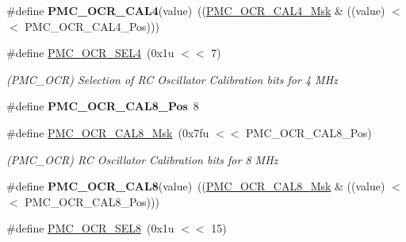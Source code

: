 \begin{DoxyCompactItemize}
\mbox{\label{group__SAME70__PMC_gade8c1c8e3ba9b7608a2f284d754883b2}} 
\#define {\bfseries P\+M\+C\+\_\+\+O\+C\+R\+\_\+\+C\+A\+L4}(value)~((\mbox{\hyperlink{group__SAMV71__PMC_ga235fcd9ef2280ab09e882e6feab2fcb4}{P\+M\+C\+\_\+\+O\+C\+R\+\_\+\+C\+A\+L4\+\_\+\+Msk}} \& ((value) $<$$<$ P\+M\+C\+\_\+\+O\+C\+R\+\_\+\+C\+A\+L4\+\_\+\+Pos)))
\item 
\mbox{\label{group__SAME70__PMC_ga66f57c76dd065ade034713e42feb7f66}} 
\#define \mbox{\hyperlink{group__SAME70__PMC_ga66f57c76dd065ade034713e42feb7f66}{P\+M\+C\+\_\+\+O\+C\+R\+\_\+\+S\+E\+L4}}~(0x1u $<$$<$ 7)
\begin{DoxyCompactList}\small\item\em (P\+M\+C\+\_\+\+O\+CR) Selection of RC Oscillator Calibration bits for 4 M\+Hz \end{DoxyCompactList}\item 
\mbox{\label{group__SAME70__PMC_gaeae5979b2df8f5a8d390e59e0e88dc6b}} 
\#define {\bfseries P\+M\+C\+\_\+\+O\+C\+R\+\_\+\+C\+A\+L8\+\_\+\+Pos}~8
\item 
\mbox{\label{group__SAME70__PMC_gaa11a6b2f86faf3641f789b99e88f3413}} 
\#define \mbox{\hyperlink{group__SAME70__PMC_gaa11a6b2f86faf3641f789b99e88f3413}{P\+M\+C\+\_\+\+O\+C\+R\+\_\+\+C\+A\+L8\+\_\+\+Msk}}~(0x7fu $<$$<$ P\+M\+C\+\_\+\+O\+C\+R\+\_\+\+C\+A\+L8\+\_\+\+Pos)
\begin{DoxyCompactList}\small\item\em (P\+M\+C\+\_\+\+O\+CR) RC Oscillator Calibration bits for 8 M\+Hz \end{DoxyCompactList}\item 
\mbox{\label{group__SAME70__PMC_ga914c02dfef2c0a80f6ab649772016836}} 
\#define {\bfseries P\+M\+C\+\_\+\+O\+C\+R\+\_\+\+C\+A\+L8}(value)~((\mbox{\hyperlink{group__SAMV71__PMC_gaa11a6b2f86faf3641f789b99e88f3413}{P\+M\+C\+\_\+\+O\+C\+R\+\_\+\+C\+A\+L8\+\_\+\+Msk}} \& ((value) $<$$<$ P\+M\+C\+\_\+\+O\+C\+R\+\_\+\+C\+A\+L8\+\_\+\+Pos)))
\item 
\mbox{\label{group__SAME70__PMC_ga78fbc712afb0e5fbacf4cf74ca649d5d}} 
\#define \mbox{\hyperlink{group__SAME70__PMC_ga78fbc712afb0e5fbacf4cf74ca649d5d}{P\+M\+C\+\_\+\+O\+C\+R\+\_\+\+S\+E\+L8}}~(0x1u $<$$<$ 15)
$$
\end{DoxyCompactItemize}
